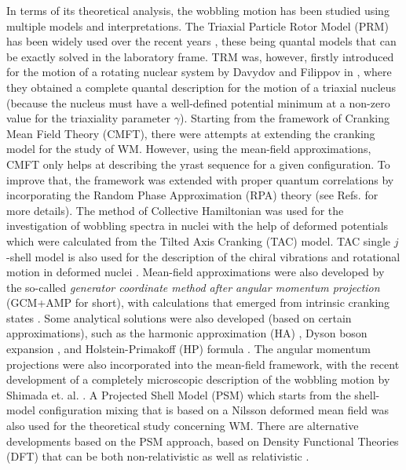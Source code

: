 \documentclass[11pt]{article}
\begin{document}
In terms of its theoretical analysis, the wobbling motion has been studied using multiple models and interpretations. The Triaxial Particle Rotor Model (PRM) has been widely used over the recent years \cite{bohr1998nuclear,hamamoto2002wobbling,frauendorf2014transverse,tanabe2006algebraic,wen2015wobbling}, these being quantal models that can be exactly solved in the laboratory frame. TRM was, however, firstly introduced for the motion of a rotating nuclear system by Davydov and Filippov in \cite{davydov1958rotational}, where they obtained a complete quantal description for the motion of a triaxial nucleus (because the nucleus must have a well-defined potential minimum at a non-zero value for the triaxiality parameter $\gamma$). Starting from the framework of Cranking Mean Field Theory (CMFT), there were attempts at extending the cranking model for the study of WM. However, using the mean-field approximations, CMFT only helps at describing the yrast sequence for a given configuration. To improve that, the framework was extended with proper quantum correlations by incorporating the Random Phase Approximation (RPA) theory (see Refs. \cite{shimizu1995nuclear,matsuzaki2002wobbling,matsuzaki2003dynamical,matsuzaki2004instability,matsuzaki2004nuclear,shimizu2005high,shimizu2008parametrizations,shoji2009microscopic} for more details).  The method of Collective Hamiltonian \cite{chen2014collective,chen2016wobbling} was used for the investigation of wobbling spectra in nuclei with the help of deformed potentials which were calculated from the Tilted Axis Cranking (TAC) model. TAC single $j$-shell model is also used for the description of the chiral vibrations and rotational motion in deformed nuclei \cite{mukhopadhyay2007chiral,qi2009chirality}. Mean-field approximations were also developed by the so-called \emph{generator coordinate method after angular momentum projection} (GCM+AMP for short), with calculations that emerged from intrinsic cranking states \cite{oi2000wobbling}. Some analytical solutions were also developed (based on certain approximations), such as the harmonic approximation (HA) \cite{bohr1998nuclear,frauendorf2014transverse,chen2014collective,raduta2017semiclassical}, Dyson boson expansion \cite{raduta2017semiclassical,raduta2020new}, and Holstein-Primakoff (HP) formula \cite{tanabe1971triaxiality,tanabe2006algebraic,tanabe2008selection,raduta2017semiclassical,raduta2020new}. The angular momentum projections were also incorporated into the mean-field framework, with the recent development of a completely microscopic description of the wobbling motion by Shimada et. al. \cite{shimada2018rotational}. A Projected Shell Model (PSM) \cite{hara1995projected} which starts from the shell-model configuration mixing that is based on a Nilsson deformed mean field was also used for the theoretical study concerning WM. There are alternative developments based on the PSM approach, based on Density Functional Theories (DFT) that can be both non-relativistic \cite{zhao2016configuration} as well as relativistic \cite{konieczka2018gamow}.
\end{document}
